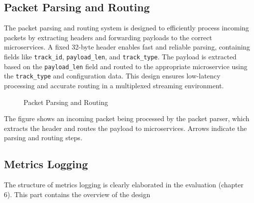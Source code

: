 {\subsection{Packet Parsing and Routing}

The packet parsing and routing system is designed to efficiently process incoming packets by extracting headers and forwarding payloads to the correct microservices. A fixed 32-byte header enables fast and reliable parsing, containing fields like \texttt{track\_id}, \texttt{payload\_len}, and \texttt{track\_type}. The payload is extracted based on the \texttt{payload\_len} field and routed to the appropriate microservice using the \texttt{track\_type} and configuration data. This design ensures low-latency processing and accurate routing in a multiplexed streaming environment.

\begin{figure}[h]
\centering
{}
\caption{Packet Parsing and Routing}
\label{fig:packet_parsing}
\end{figure}

The figure shows an incoming packet being processed by the packet parser, which extracts the header and routes the payload to microservices. Arrows indicate the parsing and routing steps.


\subsection{Metrics Logging}
The structure of metrics logging is clearly elaborated in the evaluation (chapter 6). This part contains the overview of the design 


\begin{figure}[h]
\centering
{}
\end{figure}}
